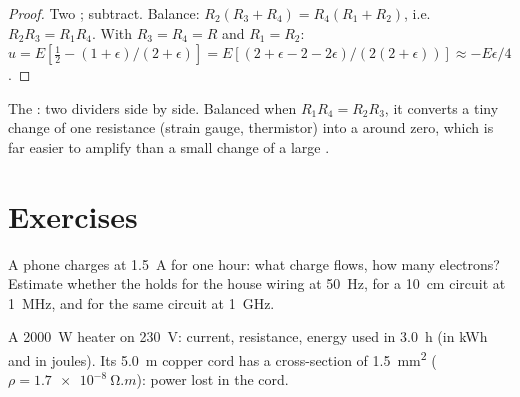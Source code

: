 \begin{proof}
Two ; subtract. Balance: $R_2(R_3 + R_4) = R_4(R_1 +
R_2)$, i.e.\ $R_2R_3 = R_1R_4$. With $R_3 = R_4 = R$ and $R_1 = R_2$:
$u = E[\tfrac12 - (1 + \epsilon)/(2 + \epsilon)] = E[(2 + \epsilon - 2 -
2\epsilon)/(2(2 + \epsilon))] \approx -E\epsilon/4$.
\end{proof}

\begin{omfigure}

{\small The : two dividers side by side. Balanced when
$R_1R_4 = R_2R_3$, it converts a tiny change of one resistance
(strain gauge, thermistor) into a  around zero, which is far
easier to amplify than a small change of a large .}
\end{omfigure}

\section{Exercises}

\begin{exercise}[$\star$]\label{exo:b1:dc-circuits:1}
A phone charges at \qty{1.5}{A} for one hour: what charge flows, how
many electrons? Estimate whether the  holds for the
house wiring at \qty{50}{Hz}, for a \qty{10}{cm} circuit at \qty{1}{MHz},
and for the same circuit at \qty{1}{GHz}.
\end{exercise}

\begin{exercise}[$\star$]\label{exo:b1:dc-circuits:2}
A \qty{2000}{W} heater on \qty{230}{V}: current, resistance, energy
used in \qty{3.0}{h} (in kWh and in joules). Its \qty{5.0}{m} copper
cord has a cross-section of \qty{1.5}{mm^2} ($\rho = \qty{1.7e-8}{\ohm.m}$):
power lost in the cord.
\end{exercise}

